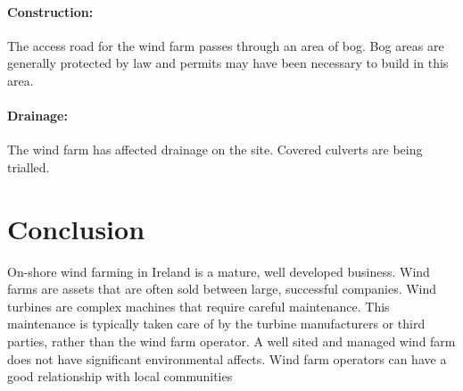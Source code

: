 \documentclass[12pt]{article} %
\begin{document}
\paragraph{Construction:} The access road for the wind farm passes through an area of bog. Bog areas are generally protected by law and permits may have been necessary to build in this area.

\paragraph{Drainage:} The wind farm has affected drainage on the site. Covered culverts are being trialled. %


\section{Conclusion}
On-shore wind farming in Ireland is a mature, well developed business. Wind farms are assets that are often sold between large, successful companies.
Wind turbines are complex machines that require careful maintenance. This maintenance is typically taken care of by the turbine manufacturers or third parties, rather than the wind farm operator. 
A well sited and managed wind farm does not have significant environmental affects. Wind farm operators can have a good relationship with local communities


\printbibliography

\end{document}
